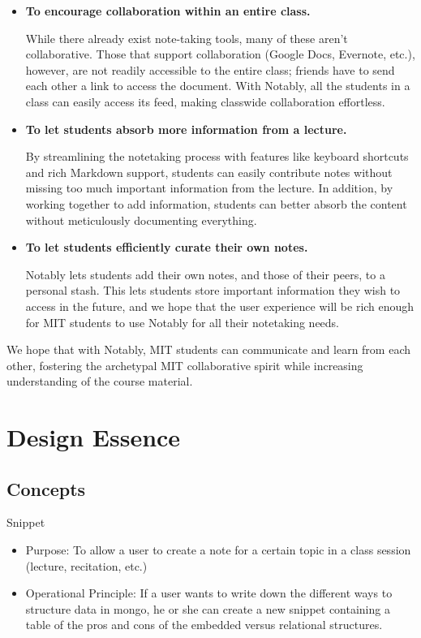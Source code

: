 \documentclass{article}
\begin{document}
\begin{itemize}
\item  \textbf{To encourage collaboration within an entire class.} 

While there already exist note-taking tools, many of these aren't collaborative. Those that support collaboration (Google Docs, Evernote, etc.), however, are not readily accessible to the entire class; friends have to send each other a link to access the document. With Notably, all the students in a class can easily access its feed, making classwide collaboration effortless.

\item \textbf{To let students absorb more information from a lecture.}

By streamlining the notetaking process with features like keyboard shortcuts and rich Markdown support, students can easily contribute notes without missing too much important information from the lecture. In addition, by working together to add information, students can better absorb the content without meticulously documenting everything.

\item \textbf{To let students efficiently curate their own notes.}

Notably lets students add their own notes, and those of their peers, to a personal stash. This lets students store important information they wish to access in the future, and we hope that the user experience will be rich enough for MIT students to use Notably for all their notetaking needs.

\end{itemize}

We hope that with Notably, MIT students can communicate and learn from each other, fostering the archetypal MIT collaborative spirit while increasing understanding of the course material.

\newpage

\section*{Design Essence}
\subsection*{Concepts}
Snippet
\begin{itemize}
\item Purpose: To allow a user to create a note for a certain topic in a class session (lecture, recitation, etc.)
\item Operational Principle: If a user wants to write down the different ways to structure data in mongo, he or she can create a new snippet containing a table of the pros and cons of the embedded versus relational structures.
\end{itemize}
\end{document}
